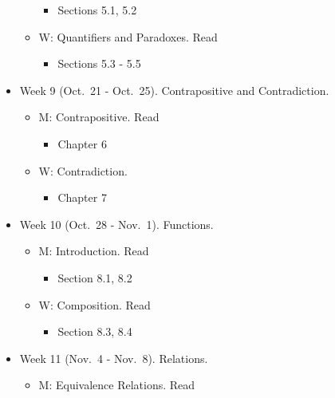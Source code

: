 \documentclass[
]{article}
\providecommand{\tightlist}{%
  \setlength{\itemsep}{0pt}\setlength{\parskip}{0pt}}
\begin{document}
\begin{itemize}
\begin{itemize}
    \begin{itemize}
    \tightlist
    \item
      Sections 5.1, 5.2
    \end{itemize}
  \item
    W: Quantifiers and Paradoxes. Read

    \begin{itemize}
    \tightlist
    \item
      Sections 5.3 - 5.5
    \end{itemize}
  \end{itemize}
\item
  Week 9 (Oct.~21 - Oct.~25). Contrapositive and Contradiction.

  \begin{itemize}
  \tightlist
  \item
    M: Contrapositive. Read

    \begin{itemize}
    \tightlist
    \item
      Chapter 6
    \end{itemize}
  \item
    W: Contradiction.

    \begin{itemize}
    \tightlist
    \item
      Chapter 7
    \end{itemize}
  \end{itemize}
\item
  Week 10 (Oct.~28 - Nov.~1). Functions.

  \begin{itemize}
  \tightlist
  \item
    M: Introduction. Read

    \begin{itemize}
    \tightlist
    \item
      Section 8.1, 8.2
    \end{itemize}
  \item
    W: Composition. Read

    \begin{itemize}
    \tightlist
    \item
      Section 8.3, 8.4
    \end{itemize}
  \end{itemize}
\item
  Week 11 (Nov.~4 - Nov.~8). Relations.

  \begin{itemize}
  \tightlist
  \item
    M: Equivalence Relations. Read


\end{itemize}
\end{itemize}
\end{document}
